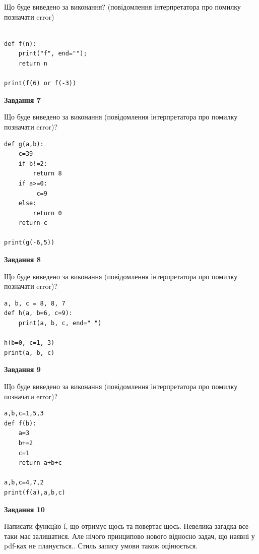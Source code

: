 \documentclass[12pt, ukrainian]{article}
\begin{document}
{\begin {large}
Що буде виведено за виконання? (повідомлення інтерпретатора про помилку позначати error)\par
\begin{verbatim}

def f(n):
    print("f", end="");
    return n

print(f(6) or f(-3))
\end{verbatim}

{\begin {center}\textbf{Завдання 7}\end {center}}

Що буде виведено за виконання (повідомлення інтерпретатора про помилку позначати error)?\par
\begin{verbatim}
def g(a,b):
    c=39
    if b!=2:
        return 8
    if a>=0:
         c=9
    else: 
        return 0
    return c

print(g(-6,5))
\end{verbatim}

{\begin {center}\textbf{Завдання 8}\end {center}}

Що буде виведено за виконання (повідомлення інтерпретатора про помилку позначати error)?\par
\begin{verbatim}
a, b, c = 8, 8, 7
def h(a, b=6, c=9):
    print(a, b, c, end=" ")

h(b=0, c=1, 3)
print(a, b, c)
\end{verbatim}

{\begin {center}\textbf{Завдання 9}\end {center}}

Що буде виведено за виконання (повідомлення інтерпретатора про помилку позначати error)?\par
\begin{verbatim}
a,b,c=1,5,3
def f(b):
    a=3
    b+=2
    c=1
    return a+b+c

a,b,c=4,7,2
print(f(a),a,b,c)
\end{verbatim}

{\begin {center}\textbf{Завдання 10}\end {center}}


Написати функцiю f, що отримує щось та повертає щось. Невелика загадка все-таки має залишатися. Але нічого принципово нового відносно задач, що наявні у pdf-ках не планується.. Стиль запису умови також оцінюється.\par
\end {large}}
\newpage
\end{document}
